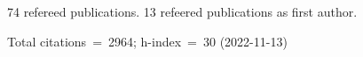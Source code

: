 74 refereed publications. 13 refeered publications as first author.

Total citations~=~2964; h-index~=~30 (2022-11-13)
